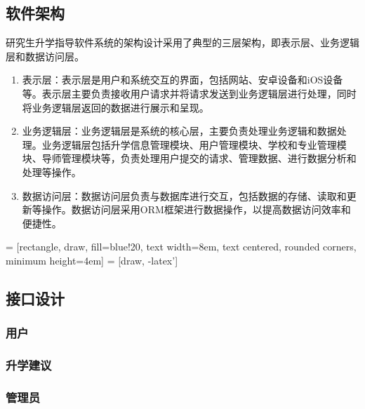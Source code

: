 \documentclass[UTF8]{ctexart}
\newcommand{\m}[1]{\textcolor{modify}{#1}}
\begin{document}
    \subsection{软件架构}
    \m{
        研究生升学指导软件系统的架构设计采用了典型的三层架构，即表示层、业务逻辑层和数据访问层。
        \begin{enumerate}
            \item 表示层：表示层是用户和系统交互的界面，包括网站、安卓设备和iOS设备等。表示层主要负责接收用户请求并将请求发送到业务逻辑层进行处理，同时将业务逻辑层返回的数据进行展示和呈现。
            \item 业务逻辑层：业务逻辑层是系统的核心层，主要负责处理业务逻辑和数据处理。业务逻辑层包括升学信息管理模块、用户管理模块、学校和专业管理模块、导师管理模块等，负责处理用户提交的请求、管理数据、进行数据分析和处理等操作。
            \item 数据访问层：数据访问层负责与数据库进行交互，包括数据的存储、读取和更新等操作。数据访问层采用ORM框架进行数据操作，以提高数据访问效率和便捷性。
        \end{enumerate}
    }
     = [rectangle, draw, fill=blue!20, text width=8em, text centered, rounded corners, minimum height=4em]
     = [draw, -latex']
    \begin{center}
    \end{center}
    \subsection{接口设计}
    \subsubsection{用户}
    \subsubsection{升学建议}
    \subsubsection{管理员}
\end{document}
